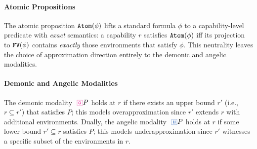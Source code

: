 \paragraph{Atomic Propositions}
The atomic proposition ${\tt Atom}(\phi)$ lifts a standard formula
$\phi$ to a capability-level predicate with \emph{exact} semantics: a
capability $r$ satisfies ${\tt Atom}(\phi)$ iff its projection to
${\tt FV}(\phi)$ contains \emph{exactly} those environments that
satisfy $\phi$.  This neutrality leaves the choice of approximation
direction entirely to the demonic and angelic modalities.

\paragraph{Demonic and Angelic Modalities}
The demonic modality $\demonic P$ holds at $r$ if there exists an
upper bound $r'$ (i.e., $r \subseteq r'$) that satisfies $P$; this
models overapproximation since $r'$ extends $r$ with additional
environments.  Dually, the angelic modality $\angelic P$ holds at $r$
if some lower bound $r' \subseteq r$ satisfies $P$; this models
underapproximation since $r'$ witnesses a specific subset of the
environments in $r$.

